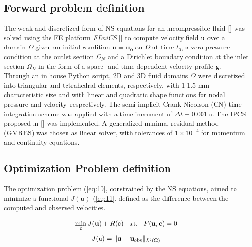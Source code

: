 

\subsection*{Forward problem definition}
The weak and discretized form of NS equations for an incompressible fluid [\cite{Stokes2009}] was solved using the FE platform \emph{FEniCS} [\cite{Alnaes2015}] to compute velocity field $\textbf{u}$ over a domain $\Omega$ given an initial condition \(\mathbf{u}=\mathbf{u_0}\) on $\Omega$ at time $t_0$, a zero pressure condition at the outlet section $\Omega_N$ and a Dirichlet boundary condition at the inlet section $\Omega_D$ in the form of a space- and time-dependent velocity profile $\textbf{g}$. Through an in house Python script, 2D and 3D fluid domains $\Omega$ were discretized into triangular and tetrahedral elements, respectively, with 1-1.5 mm characteristic size and with linear and quadratic shape functions for nodal pressure and velocity, respectively. The semi-implicit Crank-Nicolson (CN) time-integration scheme was applied with a time increment of $\Delta t = 0.001$ s. The IPCS proposed in [\cite{Goda1979}] was implemented. A generalized minimal residual method (GMRES) was chosen as linear solver, with tolerances of $1 \times 10^{-4}$ for momentum and continuity equations.

\subsection*{Optimization Problem definition}
The optimization problem (\cref{eq:10}, constrained by the NS equations, aimed to minimize a functional $J(\mathbf{u})$ (\cref{eq:11}, defined as the difference between the computed and observed velocities. 

\begin{equation}
\small
\min_{\mathbf{c}} J(\mathbf{u}) + R(\mathbf{c}) \quad \text{s.t.} \quad F(\mathbf{u}, \mathbf{c}) = 0
\label{eq:10}
\end{equation}
\begin{equation}
\small
    J(\textbf{u}) = \| \mathbf{u} - \mathbf{u}_{\text{obs}} \|_{L^2(\Omega)}
    \label{eq:11}
\end{equation}

